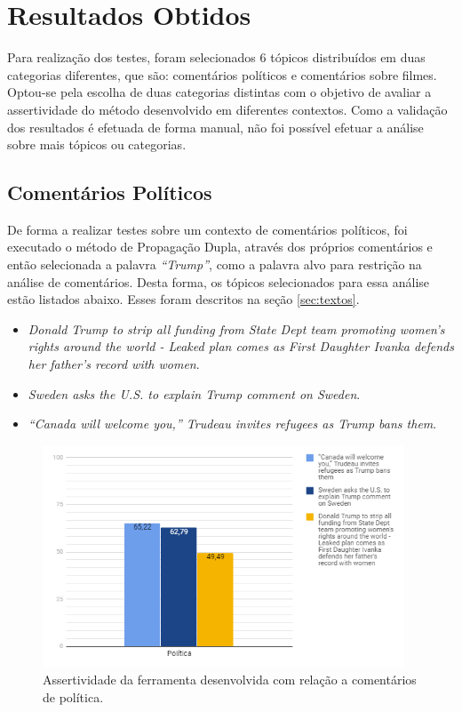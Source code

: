\chapter{Resultados Obtidos}
\label{cap:impl}

Para realização dos testes, foram
selecionados 6 tópicos distribuídos em duas categorias diferentes, que são:
comentários políticos e comentários sobre filmes. Optou-se pela escolha de duas
categorias distintas com o objetivo de avaliar a assertividade do método
desenvolvido em diferentes contextos. Como a validação dos resultados é efetuada
de forma manual, não foi possível efetuar a análise sobre mais tópicos ou
categorias.

\section{Comentários Políticos}

De forma a realizar testes sobre um contexto de comentários políticos, foi
executado o método de Propagação Dupla, através dos próprios comentários e então
selecionada a palavra \textit{``Trump''}, como a palavra alvo para
restrição na análise de comentários. Desta forma, os tópicos selecionados para
essa análise estão listados abaixo. Esses foram descritos na seção
\ref{sec:textos}.

\begin{itemize}
  \item
  \textit{Donald Trump to strip all funding from State Dept team promoting
  women's rights around the world - Leaked plan comes as First Daughter Ivanka
  defends her father's record with women}.  
  \item
  \textit{Sweden asks the U.S. to explain Trump comment on
  Sweden}.
  
  \item\textit{“Canada will welcome you,” Trudeau invites refugees as Trump bans
  them}.
\end{itemize}

 
\begin{figure}[!htbp]
\centering
\includegraphics[height=250px]{imagens/politica1.png}
\caption{Assertividade da ferramenta desenvolvida com relação a comentários de
política.}
\label{fig:pol1}
\end{figure}

